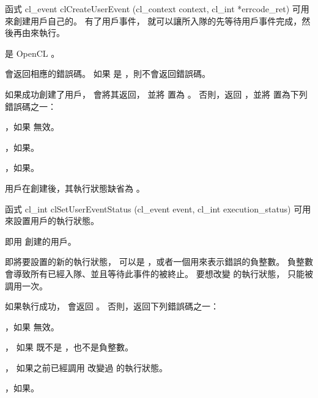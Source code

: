 函式
\startclc
cl_event clCreateUserEvent (cl_context context, cl_int *errcode_ret)
\stopclc
可用來創建用戶自己的。
有了用戶事件，
就可以讓所入隊的先等待用戶事件完成，然後再由來執行。

 是 OpenCL 。

 會返回相應的錯誤碼。
如果  是 ，則不會返回錯誤碼。

如果成功創建了用戶，  會將其返回，
並將  置為 。
否則，返回 ，並將  置為下列錯誤碼之一：
\startigBase
\item {}，如果  無效。

\item {}，如果\scdevfailres。

\item {}，如果\schostfailres。
\stopigBase

用戶在創建後，其執行狀態缺省為 。

函式
\startclc
cl_int clSetUserEventStatus (cl_event event, cl_int execution_status)
\stopclc
可用來設置用戶的執行狀態。

 即用  創建的用戶。

 即將要設置的新的執行狀態，
可以是 ，或者一個用來表示錯誤的負整數。
負整數會導致所有已經入隊、並且等待此事件的被終止。
要想改變  的執行狀態，  只能被調用一次。

如果執行成功，  會返回 。
否則，返回下列錯誤碼之一：
\startigBase
\item {}，如果  無效。

\item {}，
如果  既不是 ，也不是負整數。

\item {}，
如果之前已經調用  改變過  的執行狀態。

\item {}，如果\scdevfailres。


